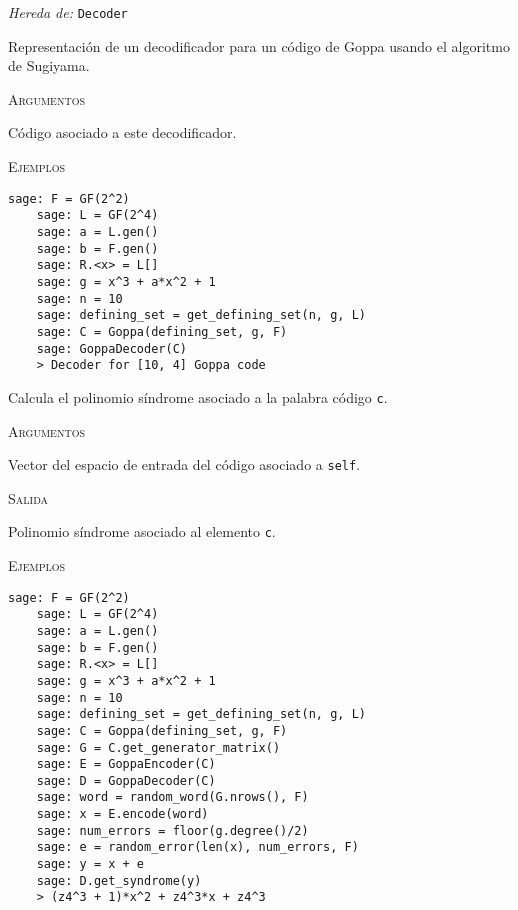 \begin{description}[leftmargin=1em, font=\normalfont\ttfamily, style=nextline]
  \item[class GoppaDecoder(self, code)]

  \emph{Hereda de:} \texttt{Decoder}

Representación de un decodificador para un código de Goppa usando el algoritmo de Sugiyama.

\textsc{Argumentos}
\begin{description}[font=\normalfont\ttfamily]
  \item[code] Código asociado a este decodificador.
\end{description}

\textsc{Ejemplos}
  \begin{lstlisting}[gobble=4]
    sage: F = GF(2^2)
    sage: L = GF(2^4)
    sage: a = L.gen()
    sage: b = F.gen()
    sage: R.<x> = L[]
    sage: g = x^3 + a*x^2 + 1
    sage: n = 10
    sage: defining_set = get_defining_set(n, g, L)
    sage: C = Goppa(defining_set, g, F)
    sage: GoppaDecoder(C)
    > Decoder for [10, 4] Goppa code
  \end{lstlisting}

\begin{description}[font=\ttfamily, style=nextline]
  \item[get\_syndrome(self, c)] Calcula el polinomio síndrome asociado a la palabra código \texttt{c}.

  \textsc{Argumentos}
  \begin{description}[font=\normalfont\ttfamily]
      \item[c] Vector del espacio de entrada del código asociado a \texttt{self}.
  \end{description}

  \textsc{Salida}
  \begin{description}[font=\normalfont\ttfamily]
      \item[] Polinomio síndrome asociado al elemento \texttt{c}.
  \end{description}

  \textsc{Ejemplos}
  \begin{lstlisting}[gobble=4]
    sage: F = GF(2^2)
    sage: L = GF(2^4)
    sage: a = L.gen()
    sage: b = F.gen()
    sage: R.<x> = L[]
    sage: g = x^3 + a*x^2 + 1
    sage: n = 10
    sage: defining_set = get_defining_set(n, g, L)
    sage: C = Goppa(defining_set, g, F)
    sage: G = C.get_generator_matrix()
    sage: E = GoppaEncoder(C)
    sage: D = GoppaDecoder(C)
    sage: word = random_word(G.nrows(), F)
    sage: x = E.encode(word)
    sage: num_errors = floor(g.degree()/2)
    sage: e = random_error(len(x), num_errors, F)
    sage: y = x + e
    sage: D.get_syndrome(y)
    > (z4^3 + 1)*x^2 + z4^3*x + z4^3
  \end{lstlisting}


\end{description}
\end{description}
